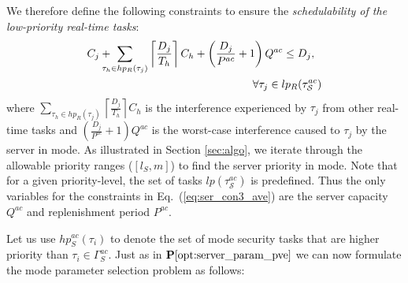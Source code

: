 \documentclass[../rt_server_main.tex]{subfiles}
\begin{document}
We therefore define the following constraints to ensure the \textit{schedulability of the low-priority real-time tasks}:
\begin{equation}\label{eq:ser_con3_ave}
\begin{aligned}
C_j + \hspace*{-1em} \sum_{\tau_h \in hp_R(\tau_j)} \left\lceil \frac{D_j}{T_h} \right\rceil C_h + \left( \frac{D_j}{P^{ac}} + 1 \right) Q^{ac} \leq D_j,~~ \\  
\forall \tau_j \in lp_R(\tau_\mathcal{S}^{ac}) 
\end{aligned}
\end{equation}
where $\sum\limits_{\tau_h \in hp_R(\tau_j)} \left\lceil \frac{D_j}{T_h} \right\rceil C_h$ is the interference experienced by $\tau_j$ from other real-time tasks and $\left( \frac{D_j}{P^{ac}} + 1 \right) Q^{ac}$ is the worst-case interference caused to $\tau_j$ by the server in \ave mode. As illustrated in Section \ref{sec:algo}, we iterate through the allowable priority ranges (\eg $[l_S, m]$) to find the server priority in \ave mode. Note that for a given priority-level, the set of tasks $lp(\tau_\mathcal{S}^{ac})$ is predefined. Thus the only variables for the constraints in Eq.~(\ref{eq:ser_con3_ave}) are the server capacity $Q^{ac}$ and replenishment period $P^{ac}$.


Let us use $hp_S^{ac}(\tau_i)$ to denote the set of \ave mode security tasks that are higher priority than $\tau_i \in \Gamma_S^{ac}$. Just as in $\mathbf{P}\mathbf{\ref{opt:server_param_pve}}$ we can now formulate the \ave mode parameter selection problem as follows:
\end{document}
